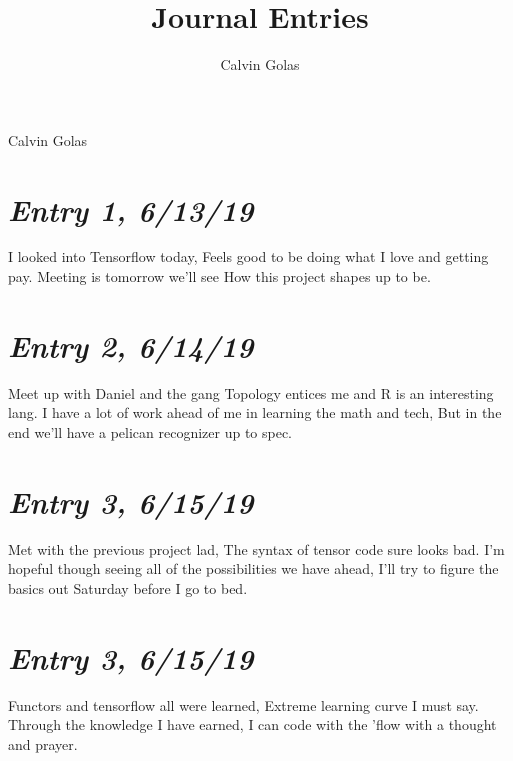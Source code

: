 \documentclass{article}
\author{Calvin Golas}
\title{Journal Entries}
\begin{document}
{\Large Calvin Golas}\\

\section{\Large \itshape  Entry 1, 6/13/19}
    I looked into Tensorflow today,
\newline
Feels good to be doing what I love and getting pay.
\newline
Meeting is tomorrow we'll see
\newline
How this project shapes up to be.

\section{\Large \itshape  Entry 2, 6/14/19}
    Meet up with Daniel and the gang
\newline
Topology entices me and R is an interesting lang.
\newline
I have a lot of work ahead of me in learning the math and tech,
\newline
But in the end we'll have a pelican recognizer up to spec.
\newline


\section{\Large \itshape  Entry 3, 6/15/19}
    Met with the previous project lad,
\newline
The syntax of tensor code sure looks bad.
\newline
I'm hopeful though seeing all of the possibilities we have ahead,
\newline
I'll try to figure the basics out Saturday before I go to bed.

\section{\Large \itshape  Entry 3, 6/15/19}
    Functors and tensorflow all were learned,
\newline
Extreme learning curve I must say.
\newline
Through the knowledge I have earned,
\newline
I can code with the 'flow with a thought and prayer.
\end{document}
